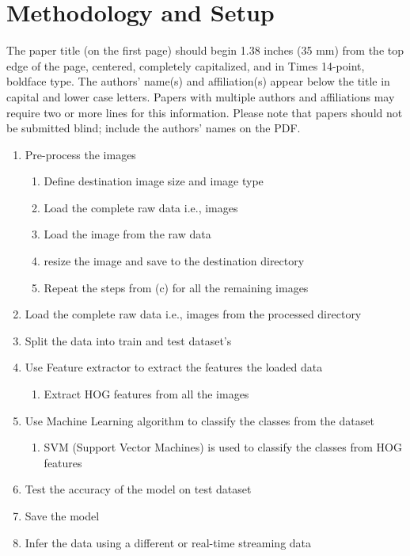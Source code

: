 \documentclass{article}
\begin{document}
\section{Methodology and Setup }
\label{sec:pagestyle}

The paper title (on the first page) should begin 1.38 inches (35 mm) from the
top edge of the page, centered, completely capitalized, and in Times 14-point,
boldface type.  The authors' name(s) and affiliation(s) appear below the title
in capital and lower case letters.  Papers with multiple authors and
affiliations may require two or more lines for this information. Please note
that papers should not be submitted blind; include the authors' names on the
PDF.

\begin{enumerate}
    \itemsep0em 
    \item Pre-process the images
        \begin{enumerate}
            \item Define destination image size and image type
            \item Load the complete raw data i.e., images
            \item Load the image from the raw data
            \item resize the image and save to the destination directory
            \item Repeat the steps from (c) for all the remaining images
        \end{enumerate}
    \item Load the complete raw data i.e., images from the processed directory
    \item Split the data into train and test dataset's
    \item Use Feature extractor to extract the features the loaded data
        \begin{enumerate}
            \item Extract HOG features from all the images
        \end{enumerate}
    \item Use Machine Learning algorithm to classify the classes from the dataset
        \begin{enumerate}
            \item SVM (Support Vector Machines) is used to classify the classes from HOG features
        \end{enumerate}
    \item Test the accuracy of the model on test dataset
    \item Save the model
    \item Infer the data using a different or real-time streaming data
\end{enumerate}
\end{document}
